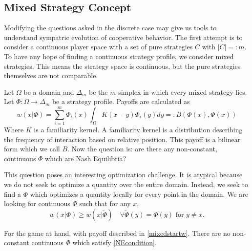 \documentclass[]{article}
\begin{document}
		\subsection{Mixed Strategy Concept}\label{mixedstrategyconcept}
		Modifying the questions asked in the discrete case may give us tools to understand sympatric evolution of cooperative behavior. The first attempt is to consider a continuous player space with a set of pure strategies $C$ with $|C|=:m$. To have any hope of finding a continuous strategy profile, we consider mixed strategies. This means the strategy space is continuous, but the pure strategies themselves are not comparable. 

			Let $\Omega$ be a domain and $\Delta_m$ be the $m$-simplex in which every mixed strategy lies. Let $\Phi:\Omega \rightarrow\Delta_m$ be a strategy profile. Payoffs are calculated as 
			\begin{equation}\label{mixedstartw}
				w(x|\Phi)=\sum_{i=1}^m \Phi_i(x)\int_\Omega K(x-y)\Phi_i(y)dy =:B(\Phi(x),\Phi(x)) 
			\end{equation} 
			Where $K$ is a familiarity kernel. A familiarity kernel is a distribution describing the frequency of interaction based on relative position. This payoff is a bilinear form which we call $B$. Now the question is: are there any non-constant, continuous $\Phi$ which are Nash Equilibria? 

			This question poses an interesting optimization challenge. It is atypical because we do not seek to optimize a quantity over the entire domain. Instead, we seek to find a $\Phi$ which optimizes a quantity locally for every point in the domain. We are looking for continuous $\Phi$ such that for any $x$,
			\begin{equation}\label{NEcondition}
				w(x|\Phi)\geq w(x|\tilde\Phi)\quad \forall \tilde \Phi(y) = \Phi (y) \text{ for } y\neq x.
			\end{equation}
		
		For the game at hand, with payoff described in \eqref{mixedstartw}. There are no non-constant continuous $\Phi$ which satisfy \eqref{NEcondition}.  
	
\end{document}
